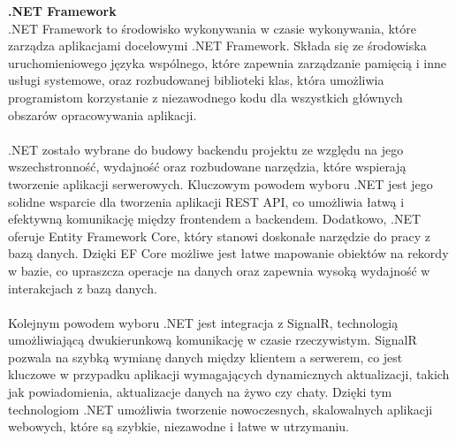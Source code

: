 \documentclass[12pt,a4paper]{article}
\begin{document}
\noindent \textbf{.NET Framework}\\
.NET Framework to środowisko wykonywania w czasie wykonywania, które zarządza aplikacjami docelowymi .NET Framework. Składa się ze środowiska uruchomieniowego języka wspólnego, które zapewnia zarządzanie pamięcią i inne usługi systemowe, oraz rozbudowanej biblioteki klas, która umożliwia programistom korzystanie z niezawodnego kodu dla wszystkich głównych obszarów opracowywania aplikacji.
\\\\
.NET zostało wybrane do budowy backendu projektu ze względu na jego wszechstronność, wydajność oraz rozbudowane narzędzia, które wspierają tworzenie aplikacji serwerowych. Kluczowym powodem wyboru .NET jest jego solidne wsparcie dla tworzenia aplikacji REST API, co umożliwia łatwą i efektywną komunikację między frontendem a backendem. Dodatkowo, .NET oferuje Entity Framework Core, który stanowi doskonałe narzędzie do pracy z bazą danych. Dzięki EF Core możliwe jest łatwe mapowanie obiektów na rekordy w bazie, co upraszcza operacje na danych oraz zapewnia wysoką wydajność w interakcjach z bazą danych.
\\\\
Kolejnym powodem wyboru .NET jest integracja z SignalR, technologią umożliwiającą dwukierunkową komunikację w czasie rzeczywistym. SignalR pozwala na szybką wymianę danych między klientem a serwerem, co jest kluczowe w przypadku aplikacji wymagających dynamicznych aktualizacji, takich jak powiadomienia, aktualizacje danych na żywo czy chaty. Dzięki tym technologiom .NET umożliwia tworzenie nowoczesnych, skalowalnych aplikacji webowych, które są szybkie, niezawodne i łatwe w utrzymaniu.
\\\\
\end{document}
